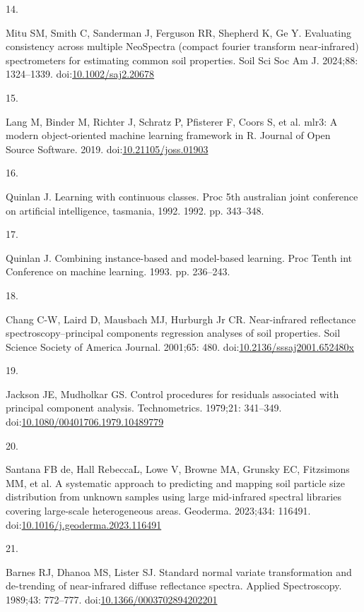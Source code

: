 \documentclass[
  letterpaper,
  DIV=11,
  numbers=noendperiod]{scrreprt}
\newlength{\cslhangindent}
\newlength{\csllabelwidth}
\newenvironment{CSLReferences}[2] %
 {\begin{list}{}{%
  \setlength{\itemindent}{0pt}
  \setlength{\leftmargin}{0pt}
  \setlength{\parsep}{0pt}
  \ifodd #1
   \setlength{\leftmargin}{\cslhangindent}
   \setlength{\itemindent}{-1\cslhangindent}
  \fi
  \setlength{\itemsep}{#2\baselineskip}}}
 {\end{list}}
\newcommand{\CSLLeftMargin}[1]{\parbox[t]{\csllabelwidth}{\strut#1\strut}}
\newcommand{\CSLRightInline}[1]{\parbox[t]{\linewidth - \csllabelwidth}{\strut#1\strut}}
\begin{document}
\begin{CSLReferences}{0}{1}
\CSLLeftMargin{14. }%
\CSLRightInline{Mitu SM, Smith C, Sanderman J, Ferguson RR, Shepherd K,
Ge Y. Evaluating consistency across multiple {NeoSpectra} (compact
fourier transform near‐infrared) spectrometers for estimating common
soil properties. Soil Sci Soc Am J. 2024;88: 1324--1339.
doi:\href{https://doi.org/10.1002/saj2.20678}{10.1002/saj2.20678}}

\CSLLeftMargin{15. }%
\CSLRightInline{Lang M, Binder M, Richter J, Schratz P, Pfisterer F,
Coors S, et al. {mlr3}: A modern object-oriented machine learning
framework in {R}. Journal of Open Source Software. 2019.
doi:\href{https://doi.org/10.21105/joss.01903}{10.21105/joss.01903}}

\CSLLeftMargin{16. }%
\CSLRightInline{Quinlan J. Learning with continuous classes. Proc 5th
australian joint conference on artificial intelligence, tasmania, 1992.
1992. pp. 343--348. }

\CSLLeftMargin{17. }%
\CSLRightInline{Quinlan J. Combining instance-based and model-based
learning. Proc Tenth int Conference on machine learning. 1993. pp.
236--243. }

\CSLLeftMargin{18. }%
\CSLRightInline{Chang C-W, Laird D, Mausbach MJ, Hurburgh Jr CR.
Near-infrared reflectance spectroscopy--principal components regression
analyses of soil properties. Soil Science Society of America Journal.
2001;65: 480.
doi:\href{https://doi.org/10.2136/sssaj2001.652480x}{10.2136/sssaj2001.652480x}}

\CSLLeftMargin{19. }%
\CSLRightInline{Jackson JE, Mudholkar GS. Control procedures for
residuals associated with principal component analysis. Technometrics.
1979;21: 341--349.
doi:\href{https://doi.org/10.1080/00401706.1979.10489779}{10.1080/00401706.1979.10489779}}

\CSLLeftMargin{20. }%
\CSLRightInline{Santana FB de, Hall RebeccaL, Lowe V, Browne MA, Grunsky
EC, Fitzsimons MM, et al. A systematic approach to predicting and
mapping soil particle size distribution from unknown samples using large
mid-infrared spectral libraries covering large-scale heterogeneous
areas. Geoderma. 2023;434: 116491.
doi:\href{https://doi.org/10.1016/j.geoderma.2023.116491}{10.1016/j.geoderma.2023.116491}}

\CSLLeftMargin{21. }%
\CSLRightInline{Barnes RJ, Dhanoa MS, Lister SJ. Standard normal variate
transformation and de-trending of near-infrared diffuse reflectance
spectra. Applied Spectroscopy. 1989;43: 772--777.
doi:\href{https://doi.org/10.1366/0003702894202201}{10.1366/0003702894202201}}


\end{CSLReferences}
\end{document}
